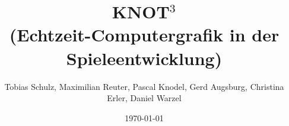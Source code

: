 \documentclass{report}
\begin{document}
\title{KNOT$^3$\\(Echtzeit-Computergrafik in der Spieleentwicklung)}
\author{Tobias Schulz, Maximilian Reuter, Pascal Knodel, Gerd Augsburg, Christina Erler, Daniel Warzel} 
\date{\today}%

\maketitle

\tableofcontents


















\end{document}
